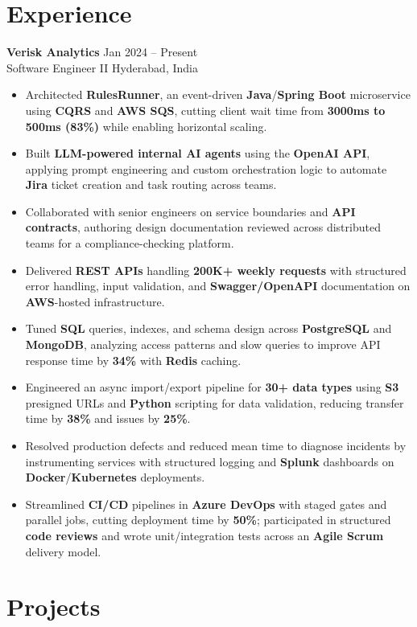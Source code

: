 \documentclass[10pt,letterpaper]{article}
\newcommand{\resumeSubheading}[4]{%
  \textbf{#1} \hfill #2 \\
  #3 \hfill #4 \\
}
\begin{document}
\section*{Experience}
\resumeSubheading{Verisk Analytics}{Jan 2024 -- Present}{Software Engineer II}{Hyderabad, India}
\begin{itemize}
    \item Architected \textbf{RulesRunner}, an event-driven \textbf{Java}/\textbf{Spring Boot} microservice using \textbf{CQRS} and \textbf{AWS SQS}, cutting client wait time from \textbf{3000ms to 500ms (83\%)} while enabling horizontal scaling.
    \item Built \textbf{LLM-powered internal AI agents} using the \textbf{OpenAI API}, applying prompt engineering and custom orchestration logic to automate \textbf{Jira} ticket creation and task routing across teams.
    \item Collaborated with senior engineers on service boundaries and \textbf{API contracts}, authoring design documentation reviewed across distributed teams for a compliance-checking platform.
    \item Delivered \textbf{REST APIs} handling \textbf{200K+ weekly requests} with structured error handling, input validation, and \textbf{Swagger/OpenAPI} documentation on \textbf{AWS}-hosted infrastructure.
    \item Tuned \textbf{SQL} queries, indexes, and schema design across \textbf{PostgreSQL} and \textbf{MongoDB}, analyzing access patterns and slow queries to improve API response time by \textbf{34\%} with \textbf{Redis} caching.
    \item Engineered an async import/export pipeline for \textbf{30+ data types} using \textbf{S3} presigned URLs and \textbf{Python} scripting for data validation, reducing transfer time by \textbf{38\%} and issues by \textbf{25\%}.
    \item Resolved production defects and reduced mean time to diagnose incidents by instrumenting services with structured logging and \textbf{Splunk} dashboards on \textbf{Docker}/\textbf{Kubernetes} deployments.
    \item Streamlined \textbf{CI/CD} pipelines in \textbf{Azure DevOps} with staged gates and parallel jobs, cutting deployment time by \textbf{50\%}; participated in structured \textbf{code reviews} and wrote unit/integration tests across an \textbf{Agile Scrum} delivery model.
\end{itemize}

\section*{Projects}
\end{document}
